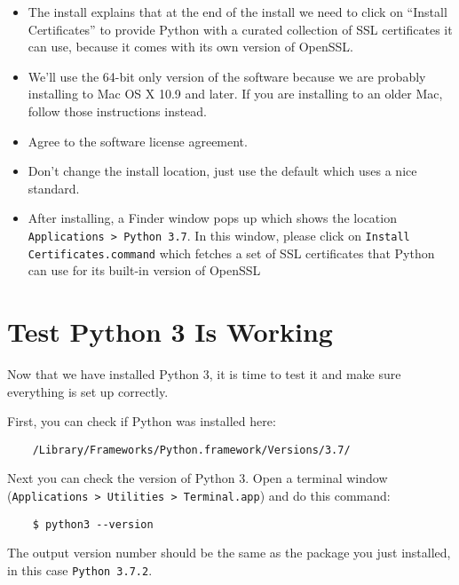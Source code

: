 \begin{itemize}

\item The install explains that at the end of the install we need
  to click on ``Install Certificates'' to provide Python with a
  curated collection of SSL certificates it can use, because it comes
  with its own version of OpenSSL.

\item We'll use the 64-bit only version of the software because
  we are probably installing to Mac OS X 10.9 and later. If you are
  installing to an older Mac, follow those instructions instead.

\item Agree to the software license agreement.

\item Don't change the install location, just use the default which
  uses a nice standard.

\item After installing, a Finder window pops up which shows the
  location \texttt{Applications > Python 3.7}. In this window, please
  click on \texttt{Install Certificates.command} which fetches a set of
  SSL certificates that Python can use for its built-in version
  of OpenSSL

\end{itemize}

\section{Test Python 3 Is Working}

Now that we have installed Python 3, it is time to test it and
make sure everything is set up correctly.

First, you can check if Python was installed here:

\begin{verbatim}
    /Library/Frameworks/Python.framework/Versions/3.7/
\end{verbatim}

Next you can check the version of Python 3. Open a terminal
window (\texttt{Applications > Utilities > Terminal.app})
and do this command:

\begin{verbatim}
    $ python3 --version
\end{verbatim}

The output version number should be the same as the package you just
installed, in this case \texttt{Python 3.7.2}.

